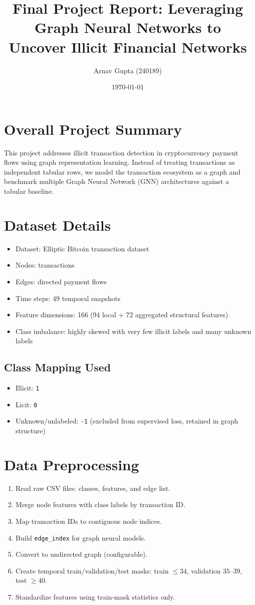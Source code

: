 \documentclass[12pt,a4paper]{article}
\title{Final Project Report: Leveraging Graph Neural Networks to Uncover Illicit Financial Networks}
\author{Arnav Gupta (240189)}
\date{\today}
\begin{document}
\maketitle

\section{Overall Project Summary}
This project addresses illicit transaction detection in cryptocurrency payment flows using graph representation learning. Instead of treating transactions as independent tabular rows, we model the transaction ecosystem as a graph and benchmark multiple Graph Neural Network (GNN) architectures against a tabular baseline.

\section{Dataset Details}
\begin{itemize}
\item Dataset: Elliptic Bitcoin transaction dataset
\item Nodes: transactions
\item Edges: directed payment flows
\item Time steps: 49 temporal snapshots
\item Feature dimensions: 166 (94 local + 72 aggregated structural features)
\item Class imbalance: highly skewed with very few illicit labels and many unknown labels
\end{itemize}

\subsection{Class Mapping Used}
\begin{itemize}
\item Illicit: \texttt{1}
\item Licit: \texttt{0}
\item Unknown/unlabeled: \texttt{-1} (excluded from supervised loss, retained in graph structure)
\end{itemize}

\section{Data Preprocessing}
\begin{enumerate}
\item Read raw CSV files: classes, features, and edge list.
\item Merge node features with class labels by transaction ID.
\item Map transaction IDs to contiguous node indices.
\item Build \texttt{edge\_index} for graph neural models.
\item Convert to undirected graph (configurable).
\item Create temporal train/validation/test masks: train $\leq 34$, validation $35$--$39$, test $\geq 40$.
\item Standardize features using train-mask statistics only.
\end{enumerate}
\end{document}

